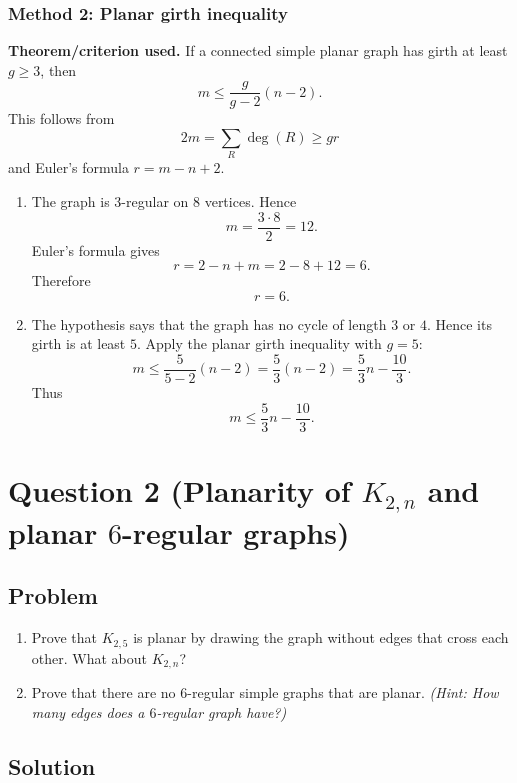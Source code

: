 \documentclass[12pt]{article}
\begin{document}
\subsubsection{Method 2: Planar girth inequality}
\textbf{Theorem/criterion used.} If a connected simple planar graph has girth at least $g\ge 3$, then
\[
  m\le \frac{g}{g-2}(n-2).
\]
This follows from
\[
  2m=\sum_R\deg(R)\ge gr
\]
and Euler's formula $r=m-n+2$.

\begin{enumerate}[label=(\alph*)]
  \item The graph is $3$-regular on $8$ vertices. Hence
  \[
    m=\frac{3\cdot 8}{2}=12.
  \]
  Euler's formula gives
  \[
    r=2-n+m=2-8+12=6.
  \]
  Therefore
  \[
    \boxed{r=6.}
  \]

  \item The hypothesis says that the graph has no cycle of length $3$ or $4$. Hence its girth is at least $5$. Apply the planar girth inequality with $g=5$:
  \[
    m\le \frac{5}{5-2}(n-2)
    =\frac{5}{3}(n-2)
    =\frac{5}{3}n-\frac{10}{3}.
  \]
  Thus
  \[
    \boxed{m\le \frac{5}{3}n-\frac{10}{3}.}
  \]
\end{enumerate}

\newpage
\section{Question 2 (Planarity of $K_{2,n}$ and planar $6$-regular graphs)}

\subsection{Problem}
\begin{enumerate}[label=(\alph*)]
  \item Prove that $K_{2,5}$ is planar by drawing the graph without edges that cross each other. What about $K_{2,n}$?
  \item Prove that there are no $6$-regular simple graphs that are planar. \textit{(Hint: How many edges does a $6$-regular graph have?)}
\end{enumerate}

\subsection{Solution}
\end{document}
